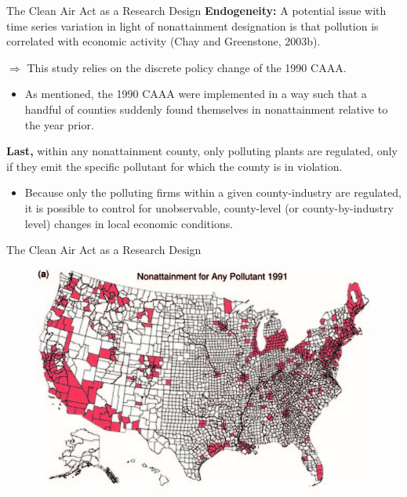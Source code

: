\documentclass{beamer}
\begin{document}
\begin{frame}{The Clean Air Act as a Research Design}
	\textbf{Endogeneity:} A potential issue with time series variation in light of nonattainment designation is that pollution is correlated with economic activity (Chay and Greenstone, 2003b).

	$\Rightarrow$ This study relies on the discrete policy change of the 1990 CAAA.
	\begin{itemize}
		\item As mentioned, the 1990 CAAA were implemented in a way such that a handful of counties suddenly found themselves in nonattainment relative to the year prior.
	\end{itemize}
	\medskip

	\textbf{Last,} within any nonattainment county, only polluting plants are regulated, only if they emit the specific pollutant for which the county is in violation.
	\begin{itemize}
		\item Because only the polluting firms within a given county-industry are regulated, it is possible to control for unobservable, county-level (or county-by-industry level) changes in local economic conditions.
	\end{itemize}
\end{frame}
\begin{frame}{The Clean Air Act as a Research Design}
	\begin{figure}[h]
		\centering
		\includegraphics[scale=1.1]{figure1a.jpg}
	\end{figure}
\end{frame}
\end{document}
